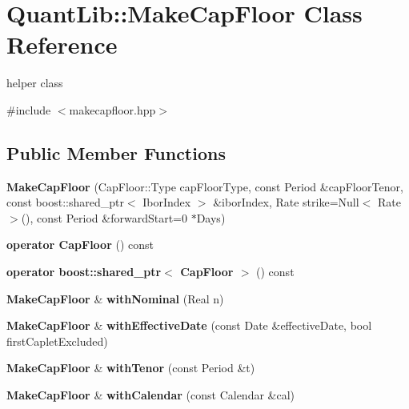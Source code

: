 \section{Quant\+Lib\+:\+:Make\+Cap\+Floor Class Reference}
\label{class_quant_lib_1_1_make_cap_floor}


helper class  




{\ttfamily \#include $<$makecapfloor.\+hpp$>$}

\subsection*{Public Member Functions}
\begin{DoxyCompactItemize}
\item 
{\bfseries Make\+Cap\+Floor} (Cap\+Floor\+::\+Type cap\+Floor\+Type, const Period \&cap\+Floor\+Tenor, const boost\+::shared\+\_\+ptr$<$ Ibor\+Index $>$ \&ibor\+Index, Rate strike=Null$<$ Rate $>$(), const Period \&forward\+Start=0 $\ast$Days)\label{class_quant_lib_1_1_make_cap_floor_ae690fd8fbfbd71818ecd8718d543bef0}

\item 
{\bfseries operator Cap\+Floor} () const \label{class_quant_lib_1_1_make_cap_floor_a37d012f410fb63c9376bc39bacea069f}

\item 
{\bfseries operator boost\+::shared\+\_\+ptr$<$ Cap\+Floor $>$} () const \label{class_quant_lib_1_1_make_cap_floor_ad43197c904d6cd1bff89b95e26806f2a}

\item 
{\bf Make\+Cap\+Floor} \& {\bfseries with\+Nominal} (Real n)\label{class_quant_lib_1_1_make_cap_floor_a370d213b5538367fe7cf8ba6b5f134bf}

\item 
{\bf Make\+Cap\+Floor} \& {\bfseries with\+Effective\+Date} (const Date \&effective\+Date, bool first\+Caplet\+Excluded)\label{class_quant_lib_1_1_make_cap_floor_a12e7678b583748fd4b7903a0e20441b5}

\item 
{\bf Make\+Cap\+Floor} \& {\bfseries with\+Tenor} (const Period \&t)\label{class_quant_lib_1_1_make_cap_floor_ab8c667ab871aad1859ff4768babe374c}

\item 
{\bf Make\+Cap\+Floor} \& {\bfseries with\+Calendar} (const Calendar \&cal)\label{class_quant_lib_1_1_make_cap_floor_a0f954fb73c7b0b06803e049fa24cb265}


\end{DoxyCompactItemize}
